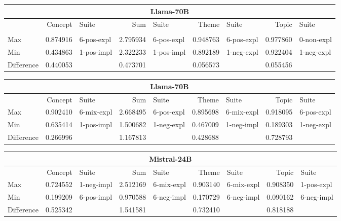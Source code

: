 \begin{table}[]
    \centering
    \tiny
    \begin{tabular}{l|rlrlrlrl}
    \toprule
    \multicolumn{9}{c}{\textbf{Llama-70B}} \\
    \midrule
     & Concept & Suite & Sum & Suite & Theme & Suite & Topic & Suite \\
     &  &  &  &  &  &  &  &  \\
    \midrule
    Max & 0.874916 & 6-pos-expl & 2.795934 & 6-pos-expl & 0.948763 & 6-pos-expl & 0.977860 & 0-non-expl \\
    Min & 0.434863 & 1-pos-impl & 2.322233 & 1-pos-impl & 0.892189 & 1-neg-expl & 0.922404 & 1-neg-expl \\
    \midrule
    Difference & 0.440053 &  & 0.473701 &  & 0.056573 &  & 0.055456 &  \\
    \bottomrule
    \end{tabular}
    
    \begin{tabular}{l|rlrlrlrl}
    \toprule
    \multicolumn{9}{c}{\textbf{Llama-70B}} \\
    \midrule
     & Concept & Suite & Sum & Suite & Theme & Suite & Topic & Suite \\
    \midrule
    Max & 0.902410 & 6-mix-expl & 2.668495 & 6-pos-expl & 0.895698 & 6-mix-expl & 0.918095 & 6-pos-expl \\
    Min & 0.635414 & 1-pos-impl & 1.500682 & 1-neg-expl & 0.467009 & 1-neg-impl & 0.189303 & 1-neg-expl \\
    \midrule
    Difference & 0.266996 &  & 1.167813 &  & 0.428688 &  & 0.728793 &  \\
    \bottomrule
    \end{tabular}
    
    \begin{tabular}{l|rlrlrlrl}
    \toprule
    \multicolumn{9}{c}{\textbf{Mistral-24B}} \\
    \midrule
     & Concept & Suite & Sum & Suite & Theme & Suite & Topic & Suite \\
    \midrule
    Max & 0.724552 & 1-neg-impl & 2.512169 & 6-mix-expl & 0.903140 & 6-mix-expl & 0.908350 & 1-pos-expl \\
    Min & 0.199209 & 6-pos-impl & 0.970588 & 6-neg-impl & 0.170729 & 6-neg-impl & 0.090162 & 6-neg-impl \\
    \midrule
    Difference & 0.525342 &  & 1.541581 &  & 0.732410 &  & 0.818188 &  \\
    \bottomrule
    \end{tabular}
    

\end{table}
